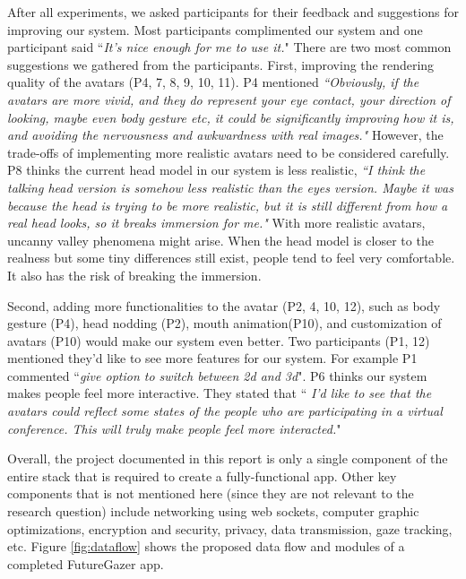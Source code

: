After all experiments, we asked participants for their feedback and suggestions for improving our system. Most participants complimented our system and one participant said ``\textit{It's nice enough for me to use it.}" There are two most common suggestions we gathered from the participants. First, improving the rendering quality of the avatars (P4, 7, 8, 9, 10, 11). P4 mentioned \textit{``Obviously, if the avatars are more vivid, and they do represent your eye contact, your direction of looking, maybe even body gesture etc, it could be significantly improving how it is, and avoiding the nervousness and awkwardness with real images." }However, the trade-offs of implementing more realistic avatars need to be considered carefully. P8 thinks the current head model in our system is less realistic, \textit{ ``I think the talking head version is somehow less realistic than the eyes version. Maybe it was because the head is trying to be more realistic, but it is still different from how a real head looks, so it breaks immersion for me."} With more realistic avatars, uncanny valley phenomena might arise. When the head model is closer to the realness but some tiny differences still exist, people tend to feel very comfortable. It also has the risk of breaking the immersion. 

Second, adding more functionalities to the avatar (P2, 4, 10, 12), such as body gesture (P4), head nodding (P2), mouth animation(P10), and customization of avatars (P10) would make our system even better. Two participants (P1, 12) mentioned they’d like to see more features for our system. For example P1 commented ``\textit{give option to switch between 2d and 3d}". P6 thinks our system makes people feel more interactive. They stated that `` \textit{I'd like to see that the avatars could reflect some states of the people who are participating in a virtual conference. This will truly make people feel more interacted.}" 

Overall, the project documented in this report is only a single component of the entire stack
that is required to create a fully-functional app. 
Other key components that is not mentioned here (since they are not relevant to the research question) include
networking using web sockets, computer graphic optimizations, encryption and security, privacy, data transmission,
gaze tracking, etc.
Figure \ref{fig:dataflow} shows the proposed data flow and modules of a completed FutureGazer app.

